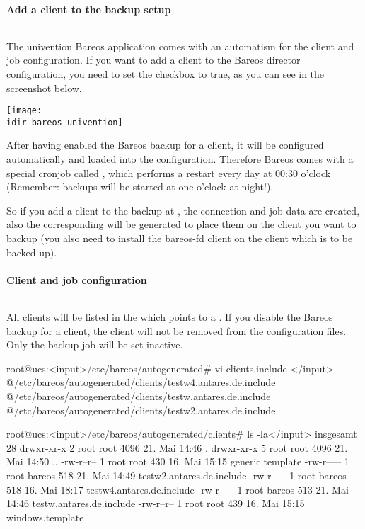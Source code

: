 \paragraph{Add a client to the backup setup}$\;$

The univention Bareos application comes with an automatism for the client and job configuration. If you want to add a client to the Bareos director configuration, you need to set the checkbox to true, as you can see in the screenshot below.

\begin{center}
  \texttt{[image: \\idir bareos-univention]}
\end{center}

After having enabled the Bareos backup for a client, it will be configured automatically and loaded into the configuration. Therefore Bareos comes with a special cronjob called , which performs a restart every day at 00:30 o'clock (Remember: backups will be started at one o'clock at night!).

So if you add a client to the backup at , the connection and job data are created, also the corresponding  will be generated to place them on the client you want to backup (you also need to install the bareos-fd client on the client which is to be backed up).

\paragraph{Client and job configuration}$\;$

All clients will be listed in the  which points to a . If you disable the Bareos backup for a client, the client will not be removed from the configuration files. Only the backup job will be set inactive.

\begin{commands}{}
root@ucs:<input>/etc/bareos/autogenerated# vi clients.include </input>
@/etc/bareos/autogenerated/clients/testw4.antares.de.include
@/etc/bareos/autogenerated/clients/testw.antares.de.include
@/etc/bareos/autogenerated/clients/testw2.antares.de.include
\end{commands}

\begin{commands}{}
root@ucs:<input>/etc/bareos/autogenerated/clients# ls -la</input>
insgesamt 28
drwxr-xr-x 2 root root 4096 21. Mai 14:46 .
drwxr-xr-x 5 root root 4096 21. Mai 14:50 ..
-rw-r--r-- 1 root root 430 16. Mai 15:15 generic.template
-rw-r----- 1 root bareos 518 21. Mai 14:49 testw2.antares.de.include
-rw-r----- 1 root bareos 518 16. Mai 18:17 testw4.antares.de.include
-rw-r----- 1 root bareos 513 21. Mai 14:46 testw.antares.de.include
-rw-r--r-- 1 root root 439 16. Mai 15:15 windows.template
\end{commands}


